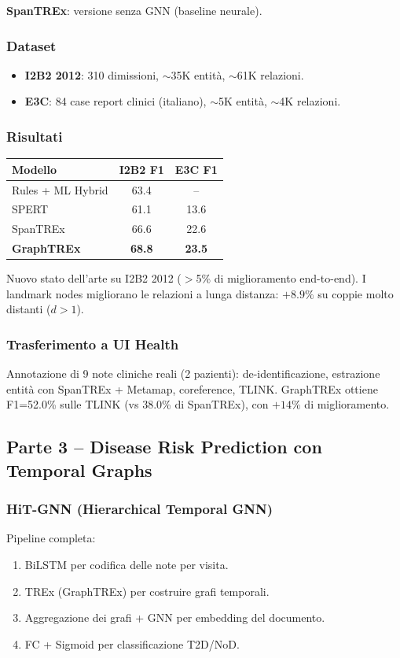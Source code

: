 \documentclass[a4paper,12pt]{article}
\begin{document}
\textbf{SpanTREx}: versione senza GNN (baseline neurale).

\subsubsection{Dataset}
\begin{itemize}
    \item \textbf{I2B2 2012}: 310 dimissioni, $\sim$35K entit\`a, $\sim$61K relazioni.
    \item \textbf{E3C}: 84 case report clinici (italiano), $\sim$5K entit\`a, $\sim$4K relazioni.
\end{itemize}

\subsubsection{Risultati}
\begin{center}
\begin{tabular}{lcc}
\toprule
\textbf{Modello} & \textbf{I2B2 F1} & \textbf{E3C F1} \\
\midrule
Rules + ML Hybrid & 63.4 & -- \\
SPERT & 61.1 & 13.6 \\
SpanTREx & 66.6 & 22.6 \\
\textbf{GraphTREx} & \textbf{68.8} & \textbf{23.5} \\
\bottomrule
\end{tabular}
\end{center}
Nuovo stato dell'arte su I2B2 2012 ($>$5\% di miglioramento end-to-end). I landmark nodes migliorano le relazioni a lunga distanza: $+8.9\%$ su coppie molto distanti ($d > 1$).

\subsubsection{Trasferimento a UI Health}
Annotazione di 9 note cliniche reali (2 pazienti): de-identificazione, estrazione entit\`a con SpanTREx + Metamap, coreference, TLINK. GraphTREx ottiene F1=52.0\% sulle TLINK (vs 38.0\% di SpanTREx), con $+14\%$ di miglioramento.

\subsection{Parte 3 -- Disease Risk Prediction con Temporal Graphs}

\subsubsection{HiT-GNN (Hierarchical Temporal GNN)}
Pipeline completa:
\begin{enumerate}
    \item BiLSTM per codifica delle note per visita.
    \item TREx (GraphTREx) per costruire grafi temporali.
    \item Aggregazione dei grafi + GNN per embedding del documento.
    \item FC + Sigmoid per classificazione T2D/NoD.
\end{enumerate}
\end{document}
